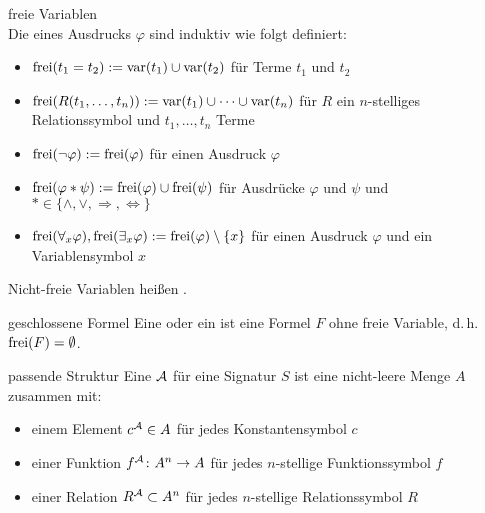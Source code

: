 \linie
\pagebreak

\begin{Def}{freie Variablen}\\
    Die  eines Ausdrucks $\varphi$ sind
    induktiv wie folgt definiert:
    \begin{itemize}
        \item
        $\text{frei}(t_1 = t_2) := \text{var}(t_1) \cup \text{var}(t_2)$ für Terme $t_1$ und $t_2$

        \item
        $\text{frei}(R(t_1, \dotsc, t_n)) := \text{var}(t_1) \cup \dotsb \cup \text{var}(t_n)$ für
        $R$ ein $n$-stelliges Relationssymbol und $t_1, \dotsc, t_n$ Terme

        \item
        $\text{frei}(\lnot \varphi) := \text{frei}(\varphi)$ für einen Ausdruck $\varphi$

        \item
        $\text{frei}(\varphi \ast \psi) := \text{frei}(\varphi) \cup \text{frei}(\psi)$ für Ausdrücke $\varphi$ und
        $\psi$ und $\ast \in \{\land, \lor, \Rightarrow, \Leftrightarrow\}$

        \item
        $\text{frei}(\forall_x \varphi), \text{frei}(\exists_x \varphi) := \text{frei}(\varphi) \setminus \{x\}$
        für einen Ausdruck $\varphi$ und ein Variablensymbol $x$
    \end{itemize}
    Nicht-freie Variablen heißen .
\end{Def}

\begin{Def}{geschlossene Formel}
    Eine  oder ein  ist eine Formel $F$
    ohne freie Variable, d.\,h. $\text{frei}(F) = \emptyset$.
\end{Def}

\linie

\begin{Def}{passende Struktur}
    Eine  $\mathcal{A}$ für eine Signatur $S$
    ist eine nicht-leere Menge $A$ zusammen mit:
    \begin{itemize}
        \item
        einem Element $c^{\mathcal{A}} \in A$ für jedes Konstantensymbol $c$

        \item
        einer Funktion $f^{\mathcal{A}}\colon A^n \rightarrow A$ für jedes $n$-stellige Funktionssymbol $f$

        \item
        einer Relation $R^{\mathcal{A}} \subset A^n$ für jedes $n$-stellige Relationssymbol $R$
    \end{itemize}
\end{Def}

